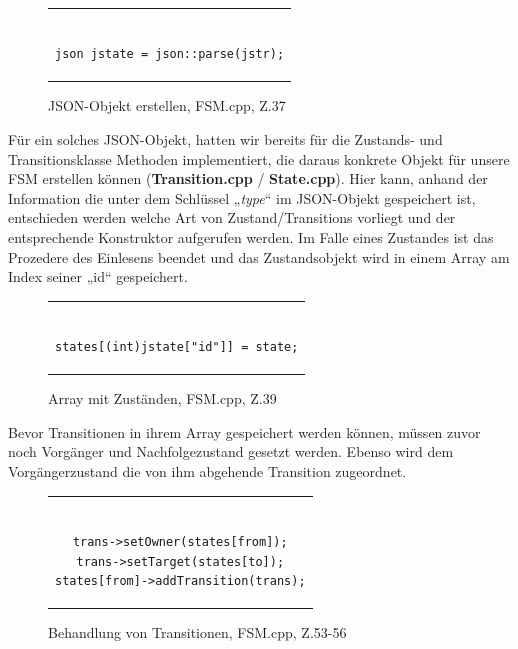 \begin{figure}[thp]
\begin{tabular}{c}
\begin{lstlisting}[style=json]

json jstate = json::parse(jstr);

\end{lstlisting}
\end{tabular}
\centering
\caption{JSON-Objekt erstellen, FSM.cpp, Z.37}
\end{figure}


Für ein solches JSON-Objekt, hatten wir bereits für die Zustands- und
Transitionsklasse Methoden implementiert, die daraus konkrete Objekt für unsere
FSM erstellen können (\textbf{Transition.cpp} / \textbf{State.cpp}).
Hier kann, anhand der Information die unter dem Schlüssel „\textit{type}“ im JSON-Objekt
gespeichert ist, entschieden werden welche Art von Zustand/Transitions vorliegt
und der entsprechende Konstruktor aufgerufen werden.
Im Falle eines Zustandes ist das Prozedere des Einlesens beendet und das
Zustandsobjekt wird in einem Array am Index seiner „id“ gespeichert.

\begin{figure}[thp]
\begin{tabular}{c}
\begin{lstlisting}[style=json]

states[(int)jstate["id"]] = state;

\end{lstlisting}
\end{tabular}
\centering
\caption{Array mit Zuständen, FSM.cpp, Z.39}
\end{figure}



Bevor Transitionen in ihrem Array gespeichert werden können, müssen zuvor noch
Vorgänger und Nachfolgezustand gesetzt werden. Ebenso wird dem Vorgängerzustand
die von ihm abgehende Transition zugeordnet.

\begin{figure}[thp]
\begin{tabular}{c}
\begin{lstlisting}[style=json]

trans->setOwner(states[from]);
trans->setTarget(states[to]);
states[from]->addTransition(trans);

\end{lstlisting}
\end{tabular}
\centering
\caption{Behandlung von Transitionen, FSM.cpp, Z.53-56}
\end{figure}

